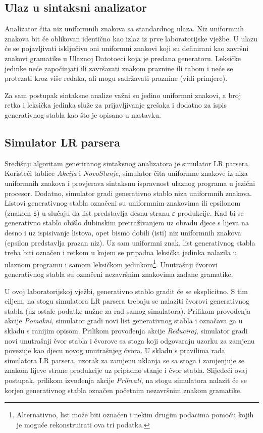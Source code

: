 \documentclass[times, 12pt, utf8]{book}
\begin{document}
\subsection{Ulaz u sintaksni analizator}
Analizator čita niz uniformnih znakova sa standardnog ulaza.
Niz uniformnih znakova bit će oblikovan identično kao izlaz iz prve laboratorijske vježbe.
U ulazu će se pojavljivati isključivo oni uniformni znakovi koji su definirani kao završni znakovi gramatike u Ulaznoj Datotoeci koja je predana generatoru.
Leksičke jedinke neće započinjati ili završavati znakom praznine ili tabom i neće se protezati kroz više redaka, ali mogu sadržavati praznine (vidi primjere).

Za sam postupak sintaksne analize važni su jedino uniformni znakovi, a broj retka i leksička jedinka služe za prijavljivanje grešaka i dodatno za ispis generativnog stabla kao što je opisano u nastavku.

\subsection{Simulator LR parsera}
Središnji algoritam generiranog sintaksnog analizatora je simulator LR parsera.
Koristeći tablice {\em Akcija} i {\em NovoStanje}, simulator čita uniformne znakove iz niza uniformnih znakova i provjerava sintaksnu ispravnost ulaznog programa u jezični procesor.
Dodatno, simulator gradi generativno stablo niza uniformnih znakova.
Listovi generativnog stabla označeni su uniformnim znakovima ili epsilonom (znakom \verb|$|) u slučaju da list predstavlja desnu stranu \(\varepsilon\)-produkcije.
Kad bi se generativno stablo obišlo dubinskim pretraživanjem uz obradu djece s lijeva na desno i uz ispisivanje listova, opet bismo dobili (isti) niz uniformnih znakova (epsilon predstavlja prazan niz).
Uz sam uniformni znak, list generativnog stabla treba biti označen i retkom u kojem se pripadna leksička jedinka nalazila u ulaznom programu i samom leksičkom jedinkom\footnote{Alternativno, list može biti označen i nekim drugim podacima pomoću kojih je moguće rekonstruirati ova tri podatka.}.
Unutrašnji čvorovi generativnog stabla su označeni nezavršnim znakovima zadane gramatike.

U ovoj laboratorijskoj vježbi, generativno stablo gradit će se eksplicitno.
S tim ciljem, na stogu simulatora LR parsera trebaju se nalaziti čvorovi generativnog stabla (uz ostale podatke nužne za rad samog simulatora).
Prilikom provođenja akcije {\em Pomakni}, simulator gradi novi list generativnog stabla i označava ga u skladu s ranijim opisom.
Prilikom provođenja akcije {\em Reduciraj}, simulator gradi novi unutrašnji čvor stabla i čvorove sa stoga koji odgovaraju uzorku za zamjenu povezuje kao djecu novog unutrašnjeg čvora.
U skladu s pravilima rada simulatora LR parsera, uzorak za zamjenu uklanja se sa stoga i zamjenjuje se znakom lijeve strane produkcije uz pripadno stanje i čvor stabla.
Slijedeći ovaj postupak, prilikom izvođenja akcije {\em Prihvati}, na stogu simulatora nalazit će se korjen generativnog stabla označen početnim nezavršnim znakom gramatike.
\end{document}
